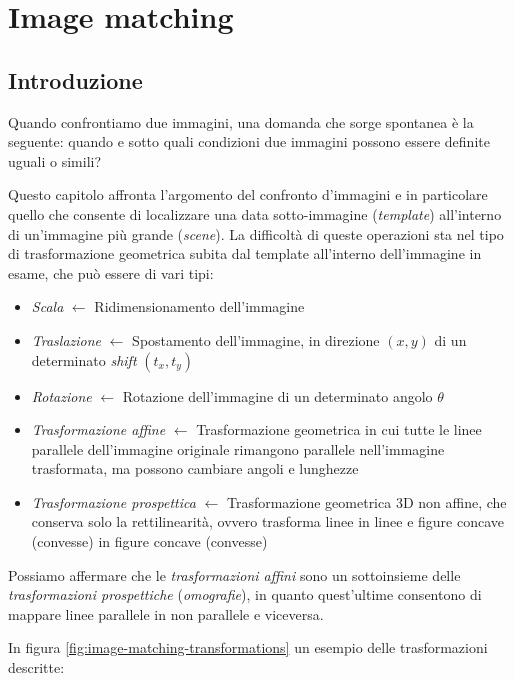 \chapter{Image matching}
\label{chap:image-matching}


\section{Introduzione}
Quando confrontiamo due immagini, una domanda che sorge spontanea \`e la seguente: quando e sotto quali condizioni due immagini possono essere definite uguali o simili?\par
Questo capitolo affronta l'argomento del confronto d'immagini e in particolare quello che consente di localizzare una data sotto-immagine (\textit{template}) all'interno di un'immagine pi\`u grande (\textit{scene}). La difficolt\`a di queste operazioni sta nel tipo di trasformazione geometrica subita dal template all'interno dell'immagine in esame, che pu\`o essere di vari tipi:
\begin{itemize}
	\item \textit{Scala} $\gets$ Ridimensionamento dell'immagine
	\item \textit{Traslazione} $\gets$ Spostamento dell'immagine, in direzione $(x, y)$ di un determinato \textit{shift} $(t_{x}, t_{y})$
	\item \textit{Rotazione} $\gets$ Rotazione dell'immagine di un determinato angolo $\theta$
	\item \textit{Trasformazione affine} $\gets$ Trasformazione geometrica in cui tutte le linee parallele dell'immagine originale rimangono parallele nell'immagine trasformata, ma possono cambiare angoli e lunghezze
	\item \textit{Trasformazione prospettica} $\gets$ Trasformazione geometrica 3D non affine, che conserva solo la rettilinearit\`a, ovvero trasforma linee in linee e figure concave (convesse) in figure concave (convesse)
\end{itemize}
Possiamo affermare che le \textit{trasformazioni affini} sono un sottoinsieme delle \textit{trasformazioni prospettiche} (\textit{omografie}), in quanto quest'ultime consentono di mappare linee parallele in non parallele e viceversa.\par
In figura \ref{fig:image-matching-transformations} un esempio delle trasformazioni descritte:
\pgfplotsset{compat=1.9}
